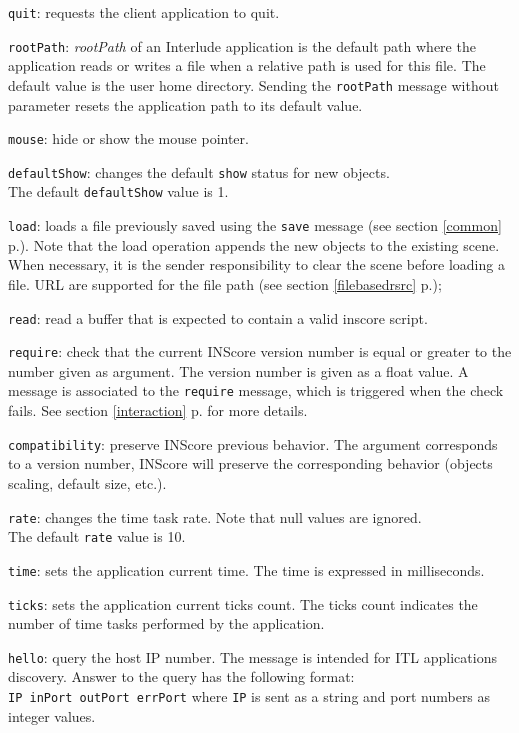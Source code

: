 \documentclass[a4paper,twoside]{report}
\newcommand{\fullref}[1]	{\ref{#1} p.\pageref{#1}}
\newcommand{\OSC}[1]		{\texttt{#1}}
\newcommand{\oldexample}	{\hspace*{1cm}}
\let\olditemize\itemize
\let\oldenditemize\enditemize
\renewenvironment{itemize} 	{\olditemize \setlength{\itemsep}{1mm}}{\oldenditemize}
\begin{document}
\begin{itemize}
\item \OSC{quit}: requests the client application to quit.

\item \OSC{rootPath}: \emph{rootPath} of an Interlude application is the default path where the application reads or writes a file when a relative path is used for this file. The default value is the user home directory. Sending the \OSC{rootPath} message without parameter resets the application path to its default value.

\item \OSC{mouse}: hide or show the mouse pointer.

\item \OSC{defaultShow}: changes the default \OSC{show} status for new objects. \\
The default \OSC{defaultShow} value is 1.

\item \OSC{load}: loads a file previously saved using the \OSC{save} message (see section \fullref{common}). Note that the load operation appends the new objects to the existing scene. When necessary, it is the sender responsibility to clear the scene before loading a file. URL are supported for the file path (see section \fullref{filebasedrsrc});

\item \OSC{read}: read a buffer that is expected to contain a valid inscore script.

\item \OSC{require}: check that the current INScore version number is equal or greater to the number given as argument. The version number is given as a float value. A message is associated to the \OSC{require} message, which is triggered when the check fails. See section \fullref{interaction} for more details.

\item \OSC{compatibility}: preserve INScore previous behavior. The argument corresponds to a version number, INScore will preserve the corresponding behavior (objects scaling, default size, etc.).

\item \OSC{rate}: changes the time task rate. Note that null values are ignored.\\
The default \OSC{rate} value is 10.

\item \OSC{time}: sets the application current time. The time is expressed in milliseconds.

\item \OSC{ticks}: sets the application current ticks count. The ticks count indicates the number of time tasks performed by the application.

\item \OSC{hello}: query the host IP number. The message is intended for ITL applications discovery. Answer to the query has the following format: \\
\oldexample \OSC{IP  inPort outPort errPort} where \OSC{IP} is sent as a string and port numbers as integer values.

\end{itemize}
\end{document}
